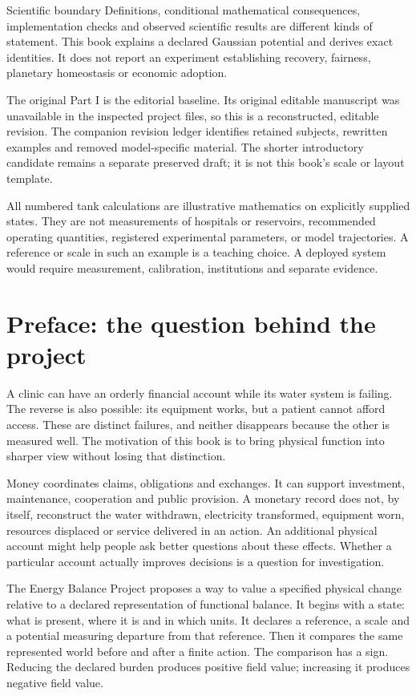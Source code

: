 \begin{lawbox}{Scientific boundary}
Definitions, conditional mathematical consequences, implementation checks and observed scientific results are different kinds of statement. This book explains a declared Gaussian potential and derives exact identities. It does not report an experiment establishing recovery, fairness, planetary homeostasis or economic adoption.
\end{lawbox}

The original Part I is the editorial baseline. Its original editable manuscript was unavailable in the inspected project files, so this is a reconstructed, editable revision. The companion revision ledger identifies retained subjects, rewritten examples and removed model-specific material. The shorter introductory candidate remains a separate preserved draft; it is not this book's scale or layout template.

All numbered tank calculations are illustrative mathematics on explicitly supplied states. They are not measurements of hospitals or reservoirs, recommended operating quantities, registered experimental parameters, or model trajectories. A reference or scale in such an example is a teaching choice. A deployed system would require measurement, calibration, institutions and separate evidence.

\chapter*{Preface: the question behind the project}
A clinic can have an orderly financial account while its water system is failing. The reverse is also possible: its equipment works, but a patient cannot afford access. These are distinct failures, and neither disappears because the other is measured well. The motivation of this book is to bring physical function into sharper view without losing that distinction.

Money coordinates claims, obligations and exchanges. It can support investment, maintenance, cooperation and public provision. A monetary record does not, by itself, reconstruct the water withdrawn, electricity transformed, equipment worn, resources displaced or service delivered in an action. An additional physical account might help people ask better questions about these effects. Whether a particular account actually improves decisions is a question for investigation.

The Energy Balance Project proposes a way to value a specified physical change relative to a declared representation of functional balance. It begins with a state: what is present, where it is and in which units. It declares a reference, a scale and a potential measuring departure from that reference. Then it compares the same represented world before and after a finite action. The comparison has a sign. Reducing the declared burden produces positive field value; increasing it produces negative field value.

